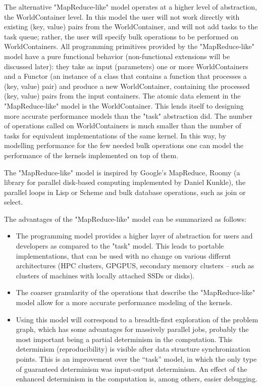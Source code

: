 \documentclass{article}
\begin{document}
The alternative "MapReduce-like" model operates at a higher level of
abstraction, the WorldContainer level. In this model the user will not work
directly with existing (key, value) pairs from the WorldContainer, and will
not add tasks to the task queue; rather, the user will specify bulk
operations to be performed on WorldContainers. All programming primitives
provided by the "MapReduce-like" model have a pure functional behavior
(non-functional extensions will be discussed later): they take as input
(parameters) one or more WorldContainers and a Functor (an instance of a
class that contains a function that processes a (key, value) pair) and
produce a new WorldContainer, containing the processed (key, value) pairs
from the input containers.  The atomic data element in the "MapReduce-like"
model is the WorldContainer. This lends itself to designing more accurate
performance models than the "task" abstraction did. The number of operations
called on WorldContainers is much smaller than the number of tasks for
equivalent implementations of the same kernel. In this way, by modelling
performance for the few needed bulk operations one can model the performance
of the kernels implemented on top of them.

The "MapReduce-like" model is inspired by Google's MapReduce, Roomy (a
library for parallel disk-based computing implemented by Daniel Kunkle),
the parallel loops in Lisp or Scheme and bulk database operations, such
as join or select.

The advantages of the "MapReduce-like" model can be summarized as follows:
\begin{itemize}
\item The programming model provides a higher layer of abstraction for users
and developers as compared to the "task" model. This leads to portable
implementations, that can be used with no change on various differnt
architectures (HPC clusters, GPGPUS, secondary memory clusters -- such as
clusters of machines with locally attached SSDs or disks).  
\item The coarser granularity of the operations that describe the
"MapReduce-like" model allow for a more accurate performance modeling of the
kernels.  
\item Using this model will correspond to a breadth-first exploration of the
problem graph, which has some advantages for massively parallel jobs, probably
the most important being a partial determinism in the computation.
This determinism (reproducibility) is visible
after data structure synchronization points. This is an improvement over the
``task'' model, in which the only type of guaranteed determinism was
input-output determinism. An effect of the enhanced determinism in the
computation is, among others, easier debugging.
\end{itemize}
\end{document}
